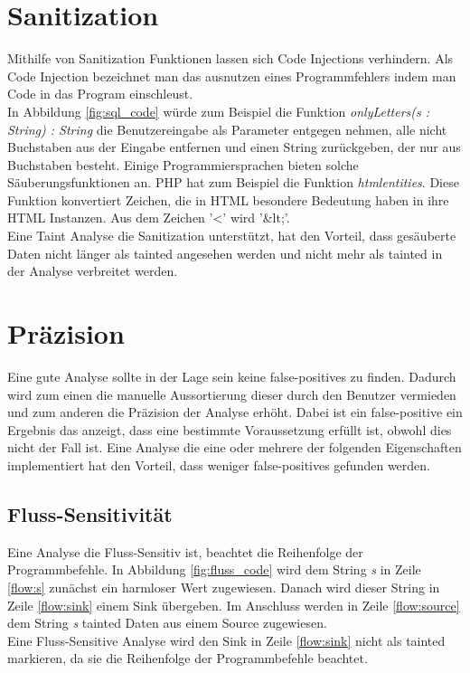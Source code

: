 \documentclass[runningheads]{llncs}
\begin{document}
\section{Sanitization}
Mithilfe von Sanitization Funktionen lassen sich Code Injections verhindern. Als Code Injection bezeichnet man das ausnutzen eines Programmfehlers indem man Code in das Program einschleust.
\\In Abbildung \ref{fig:sql_code} würde zum Beispiel die Funktion \emph{onlyLetters(s : String) : String} die Benutzereingabe als Parameter entgegen nehmen, alle nicht Buchstaben aus der Eingabe entfernen und einen String zurückgeben, der nur aus Buchstaben besteht. Einige Programmiersprachen bieten solche Säuberungsfunktionen an. PHP hat zum Beispiel die Funktion \emph{htmlentities}. Diese Funktion konvertiert Zeichen, die in HTML besondere Bedeutung haben in ihre HTML Instanzen. Aus dem Zeichen '\textless' wird '\&lt;'.\\
Eine Taint Analyse die Sanitization unterstützt, hat den Vorteil, dass gesäuberte Daten nicht länger als tainted angesehen werden und nicht mehr als tainted in der Analyse verbreitet werden.

\section{Präzision}\label{sec:precision}
Eine gute Analyse sollte in der Lage sein keine false-positives zu finden. Dadurch wird zum einen die manuelle Aussortierung dieser durch den Benutzer vermieden und zum anderen die Präzision der Analyse erhöht. Dabei ist ein false-positive ein Ergebnis das anzeigt, dass eine bestimmte Voraussetzung erfüllt ist, obwohl dies nicht der Fall ist. Eine Analyse die eine oder mehrere der folgenden Eigenschaften implementiert hat den Vorteil, dass weniger false-positives gefunden werden.

\subsection{Fluss-Sensitivität}
Eine Analyse die Fluss-Sensitiv ist, beachtet die Reihenfolge der Programmbefehle.
In Abbildung \ref{fig:fluss_code} wird dem String \emph{s} in Zeile \ref{flow:s} zunächst ein harmloser Wert zugewiesen. Danach wird dieser String in Zeile \ref{flow:sink} einem Sink übergeben. Im Anschluss werden in Zeile \ref{flow:source} dem String \emph{s} tainted Daten aus einem Source zugewiesen. \\
Eine Fluss-Sensitive Analyse wird den Sink in Zeile \ref{flow:sink} nicht als tainted markieren, da sie die Reihenfolge der Programmbefehle beachtet. 
\end{document}
